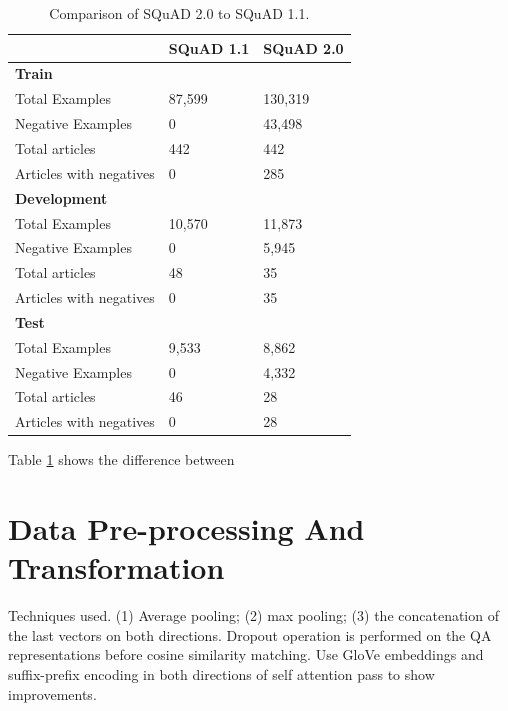\documentclass[a4paper,12pt]{report}
\begin{document}
		\begin{table}[h!]
		              \centering
		                \begin{tabular}{|l|l|l|}
		                    \hline
		                     & SQuAD 1.1 &  SQuAD 2.0 \\
		                    \hline
		                    \textbf{Train} & & \\
		                        Total Examples & 87,599 &  130,319 \\
		                        Negative Examples & 0 & 43,498 \\
		                        Total articles & 442 & 442 \\
		                        Articles with negatives & 0 & 285 \\
		                    \hline
		                    \textbf{Development} & & \\
		                        Total Examples & 10,570 &  11,873 \\
		                        Negative Examples & 0 & 5,945 \\
		                        Total articles & 48 & 35 \\
		                        Articles with negatives & 0 & 35 \\
		                    \hline
		                    \textbf{Test} &  & \\
		                        Total Examples & 9,533 & 8,862 \\
		                        Negative Examples & 0 & 4,332 \\
		                        Total articles & 46 & 28 \\
		                        Articles with negatives & 0 & 28 \\
		                    \hline
		                \end{tabular}
		                \caption{Comparison of  SQuAD 2.0 to SQuAD 1.1\citep{dataset}.}\label{datasetDescription}
		 \end{table}

    Table \ref{datasetDescription} shows the difference between
    \section{Data Pre-processing And Transformation}\label{c32}
    Techniques used.
    (1) Average pooling; (2) max pooling; (3) the concatenation of the last vectors on both directions. Dropout operation is performed on the QA representations before cosine similarity matching. Use GloVe embeddings and suffix-prefix encoding in both directions of self attention pass to show improvements.
\end{document}
